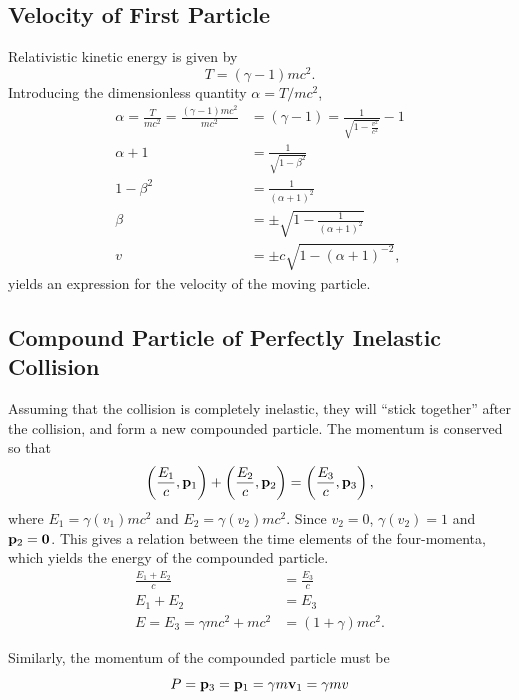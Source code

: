 \documentclass[11pt]{amsart}
\begin{document}
\subsection{Velocity of First Particle}
Relativistic kinetic energy is given by
\begin{equation}
\label{eq:relkinenergy}
T = (\gamma-1)mc^2.
\end{equation}
Introducing the dimensionless quantity $\alpha = T/mc^2$,
\begin{align*}
\alpha = \frac{T}{mc^2} = \frac{(\gamma - 1)mc^2}{mc^2} &= (\gamma-1) = \frac{1}{\sqrt{1-\frac{v^2}{c^2}}} - 1 \\
\alpha + 1 &= \frac{1}{\sqrt{1-\beta^2}} \\
1 - \beta^2 &= \frac{1}{(\alpha + 1)^2} \\
\beta &= \pm \sqrt{1 - \frac{1}{(\alpha + 1)^2}} \\
v &= \pm c \sqrt{1-(\alpha + 1)^{-2}},
\end{align*}
yields an expression for the velocity of the moving particle.

\subsection{Compound Particle of Perfectly Inelastic Collision}
Assuming that the collision is completely inelastic, they will ``stick together'' after the collision, and form a new compounded particle. The momentum is conserved so that
\begin{equation}
\label{eq:momentumconservation1}
\left(\frac{E_1}{c}, \vb{p}_1 \right) + \left(\frac{E_2}{c}, \vb{p}_2 \right) = \left(\frac{E_3}{c}, \vb{p}_3 \right) ,
\end{equation}
where $E_1 = \gamma(v_1)mc^2$ and $E_2 = \gamma(v_2)mc^2$. Since $v_2 = 0$, $\gamma(v_2) = 1$ and $\vb{p}_2 = \vb{0}$. This gives a relation between the time elements of the four-momenta, which yields the energy of the compounded particle.
\begin{align}
\frac{E_1 + E_2}{c} &= \frac{E_3}{c} \nonumber \\
E_1 + E_2 &= E_3 \nonumber \\
E = E_3 =  \gamma mc^2 + mc^2 &= (1 + \gamma)mc^2.
\end{align}

Similarly, the momentum of the compounded particle must be
\begin{equation}
P = \vb{p}_3 = \vb{p}_1 = \gamma m\vb{v}_1 = \gamma m v 
\end{equation}
\end{document}
